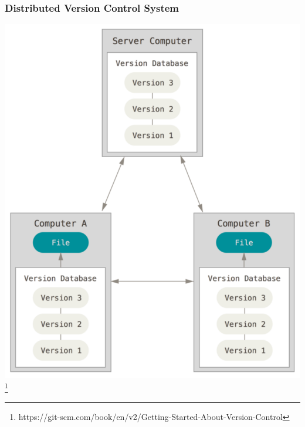 \begin{frame}
  \frametitle{Distributed Version Control System}
  \centering
  \includegraphics[height=0.80\textheight]{distributed-vcs}
  \footnote{https://git-scm.com/book/en/v2/Getting-Started-About-Version-Control}
\end{frame}

